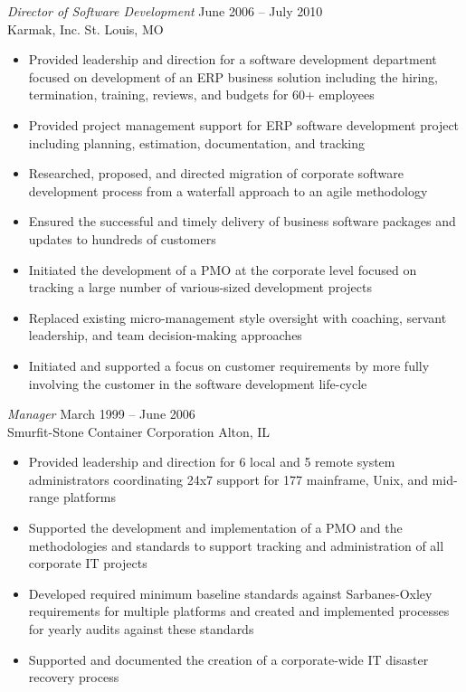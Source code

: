 \documentclass[margin,line]{resume}
\begin{document}
\begin{resume}
{\sl Director of Software Development} \hfill June 2006 -- July 2010\\
Karmak, Inc. \hfill St. Louis, MO
\begin{itemize} \itemsep -2pt %
\small\item Provided leadership and direction for a software development department focused on development of an ERP business solution including the hiring, termination, training, reviews, and budgets for 60+ employees
\small\item Provided project management support for ERP software development project including planning, estimation, documentation, and tracking
\small\item Researched, proposed, and directed migration of corporate software development process from a waterfall approach to an agile methodology
\small\item Ensured the successful and timely delivery of business software packages and updates to hundreds of customers
\small\item Initiated the development of a PMO at the corporate level focused on tracking a large number of various-sized development projects
\small\item Replaced existing micro-management style oversight with coaching, servant leadership, and team decision-making approaches
\small\item Initiated and supported a focus on customer requirements by more fully involving the customer in the software development life-cycle
\end{itemize}

{\sl Manager} \hfill March 1999 -- June 2006\\
Smurfit-Stone Container Corporation \hfill Alton, IL
\begin{itemize} \itemsep -2pt %
\small\item Provided leadership and direction for 6 local and 5 remote system administrators coordinating 24x7 support for 177 mainframe, Unix, and mid-range platforms
\small\item Supported the development and implementation of a PMO and the methodologies and standards to support tracking and administration of all corporate IT projects
\small\item Developed required minimum baseline standards against Sarbanes-Oxley requirements for multiple platforms and created and implemented processes for yearly audits against these standards
\small\item Supported and documented the creation of a corporate-wide IT disaster recovery process
\end{itemize}


\end{resume}
\end{document}
